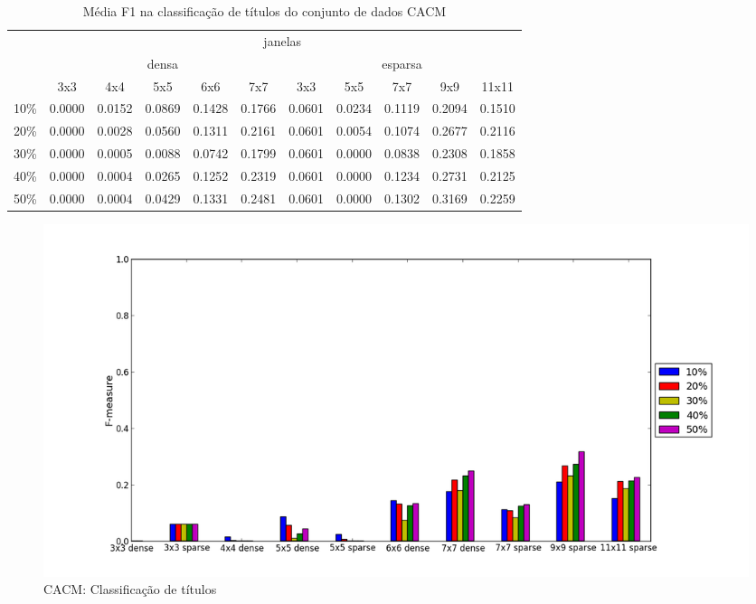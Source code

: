 \documentclass[a4paper,11pt]{article}
\begin{document}
  \begin{center}
    \begin{table}[p]
      \caption{Média F1 na classificação de títulos do conjunto de dados CACM}
      \begin{tabular}{ l | c c c c c || c c c c c | }
        \cline{2-11}
        & \multicolumn{10}{|c|}{janelas} \\
        \cline{2-11}
        & \multicolumn{5}{c||}{densa} & \multicolumn{5}{c|}{esparsa} \\
        \cline{2-11}
        & 3x3 & 4x4 & 5x5 & 6x6 & 7x7 & 3x3 & 5x5 & 7x7 & 9x9 & 11x11 \\
        \hline
        \multicolumn{1}{|l|}{10\%}& 0.0000& 0.0152& 0.0869& 0.1428& 0.1766& 0.0601& 0.0234& 0.1119& 0.2094& 0.1510\\
        \multicolumn{1}{|l|}{20\%}& 0.0000& 0.0028& 0.0560& 0.1311& 0.2161& 0.0601& 0.0054& 0.1074& 0.2677& 0.2116\\
        \multicolumn{1}{|l|}{30\%}& 0.0000& 0.0005& 0.0088& 0.0742& 0.1799& 0.0601& 0.0000& 0.0838& 0.2308& 0.1858\\
        \multicolumn{1}{|l|}{40\%}& 0.0000& 0.0004& 0.0265& 0.1252& 0.2319& 0.0601& 0.0000& 0.1234& 0.2731& 0.2125\\
        \multicolumn{1}{|l|}{50\%}& 0.0000& 0.0004& 0.0429& 0.1331& 0.2481& 0.0601& 0.0000& 0.1302& 0.3169& 0.2259\\
        \hline  
      \end{tabular}
      \label{tab:cacm_f1_heading}
    \end{table}
  \end{center}

  \begin{figure}[p]
    \centerline{\includegraphics[width=1.2\textwidth]{assets/experiment_charts/cacm_TextRegion_heading_f1.png}}
    \caption{CACM: Classificação de títulos}
    \label{fig:cacm_TextRegion_heading_f1}
  \end{figure}
\end{document}
